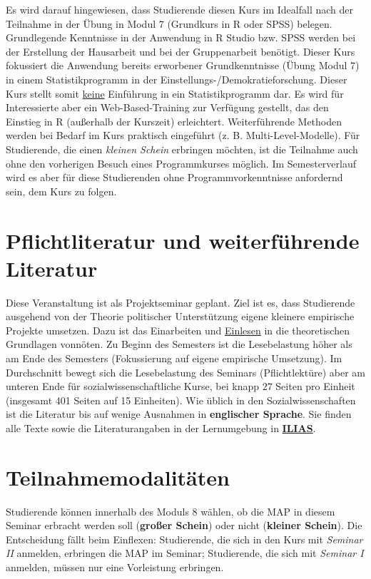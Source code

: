 \documentclass[11pt,a4paper]{article}
\begin{document}
Es wird darauf hingewiesen, dass Studierende diesen Kurs im Idealfall nach der Teilnahme in der Übung in Modul 7 (Grundkurs in R oder SPSS) belegen. Grundlegende Kenntnisse in der Anwendung in R Studio bzw. SPSS werden bei der Erstellung der Hausarbeit und bei der Gruppenarbeit benötigt. Dieser Kurs fokussiert die Anwendung bereits erworbener Grundkenntnisse (Übung Modul 7) in einem Statistikprogramm in der Einstellungs-/Demokratieforschung. Dieser Kurs stellt somit \underline{keine} Einführung in ein Statistikprogramm dar. Es wird für Interessierte aber ein Web-Based-Training zur Verfügung gestellt, das den Einstieg in R (außerhalb der Kurszeit) erleichtert. Weiterführende Methoden werden bei Bedarf im Kurs praktisch eingeführt (z. B. Multi-Level-Modelle). Für Studierende, die einen \textit{kleinen Schein} erbringen möchten, ist die Teilnahme auch ohne den vorherigen Besuch eines Programmkurses möglich. Im Semesterverlauf wird es aber für diese Studierenden ohne Programmvorkenntnisse anfordernd sein, dem Kurs zu folgen.

\section*{Pflichtliteratur und weiterführende Literatur}
Diese Veranstaltung ist als Projektseminar geplant. Ziel ist es, dass Studierende ausgehend von der Theorie politischer Unterstützung eigene kleinere empirische Projekte umsetzen. Dazu ist das Einarbeiten und \underline{Einlesen} in die theoretischen Grundlagen vonnöten. Zu Beginn des Semesters ist die Lesebelastung höher als am Ende des Semesters (Fokussierung auf eigene empirische Umsetzung). Im Durchschnitt bewegt sich die Lesebelastung des Seminars (Pflichtlektüre) aber am unteren Ende für sozialwissenschaftliche Kurse, bei knapp $27$ Seiten pro Einheit (insgesamt 401 Seiten auf 15 Einheiten). Wie üblich in den Sozialwissenschaften ist die Literatur bis auf wenige Ausnahmen in \textbf{englischer Sprache}. Sie finden alle Texte sowie die Literaturangaben in der Lernumgebung in \href{https://ilias.uni-giessen.de/ilias/goto.php?target=prtf_415969_35654&client_id=JLUG}{\textbf{ILIAS}}. 

\section*{Teilnahmemodalitäten}
Studierende können innerhalb des Moduls 8 wählen, ob die MAP in diesem Seminar erbracht werden soll (\textbf{großer Schein}) oder nicht (\textbf{kleiner Schein}). Die Entscheidung fällt beim Einflexen: Studierende, die sich in den Kurs mit \textit{Seminar II} anmelden, erbringen die MAP im Seminar; Studierende, die sich mit \textit{Seminar I} anmelden, müssen nur eine Vorleistung erbringen. \newline
\end{document}
